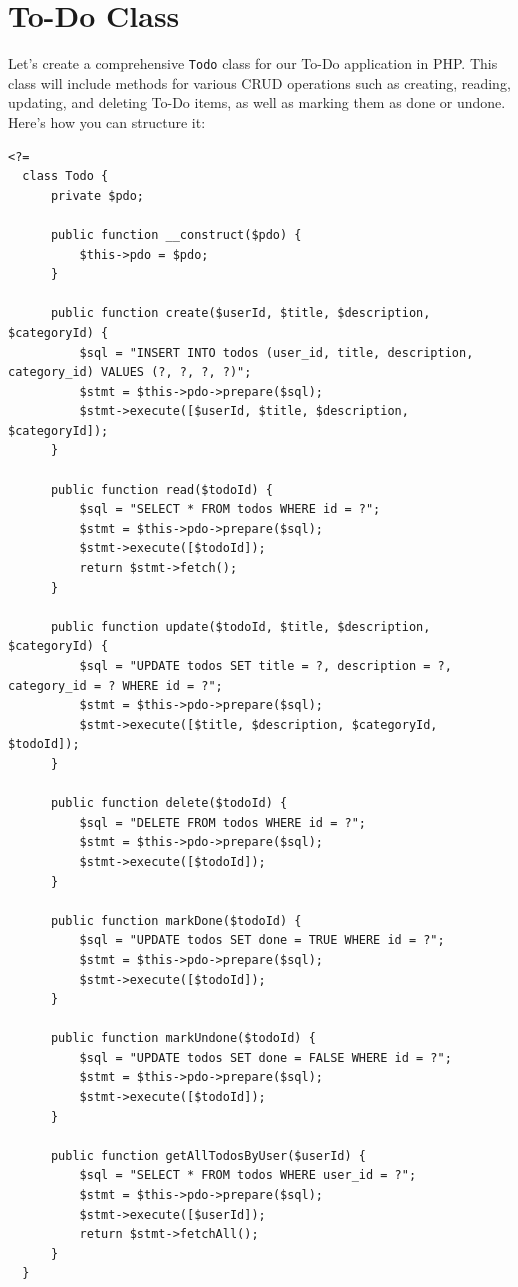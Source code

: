 \documentclass[11pt]{article}
\date{}
\title{}
\begin{document}
\setcounter{tocdepth}{3}
\tableofcontents

\setlength\parindent{10pt}

\section{To-Do Class}
\label{sec:org40600f6}

Let's create a comprehensive \texttt{Todo} class for our To-Do
application in PHP. This class will include methods for various CRUD
operations such as creating, reading, updating, and deleting To-Do
items, as well as marking them as done or undone. Here's how you can
structure it:

\begin{verbatim}
<?=
  class Todo {
      private $pdo;

      public function __construct($pdo) {
          $this->pdo = $pdo;
      }

      public function create($userId, $title, $description, $categoryId) {
          $sql = "INSERT INTO todos (user_id, title, description, category_id) VALUES (?, ?, ?, ?)";
          $stmt = $this->pdo->prepare($sql);
          $stmt->execute([$userId, $title, $description, $categoryId]);
      }

      public function read($todoId) {
          $sql = "SELECT * FROM todos WHERE id = ?";
          $stmt = $this->pdo->prepare($sql);
          $stmt->execute([$todoId]);
          return $stmt->fetch();
      }

      public function update($todoId, $title, $description, $categoryId) {
          $sql = "UPDATE todos SET title = ?, description = ?, category_id = ? WHERE id = ?";
          $stmt = $this->pdo->prepare($sql);
          $stmt->execute([$title, $description, $categoryId, $todoId]);
      }

      public function delete($todoId) {
          $sql = "DELETE FROM todos WHERE id = ?";
          $stmt = $this->pdo->prepare($sql);
          $stmt->execute([$todoId]);
      }

      public function markDone($todoId) {
          $sql = "UPDATE todos SET done = TRUE WHERE id = ?";
          $stmt = $this->pdo->prepare($sql);
          $stmt->execute([$todoId]);
      }

      public function markUndone($todoId) {
          $sql = "UPDATE todos SET done = FALSE WHERE id = ?";
          $stmt = $this->pdo->prepare($sql);
          $stmt->execute([$todoId]);
      }

      public function getAllTodosByUser($userId) {
          $sql = "SELECT * FROM todos WHERE user_id = ?";
          $stmt = $this->pdo->prepare($sql);
          $stmt->execute([$userId]);
          return $stmt->fetchAll();
      }
  }
\end{verbatim}
\end{document}
